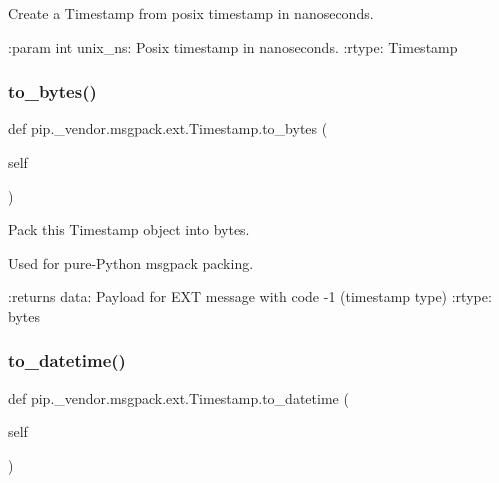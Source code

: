 \begin{DoxyVerb}Create a Timestamp from posix timestamp in nanoseconds.

:param int unix_ns: Posix timestamp in nanoseconds.
:rtype: Timestamp
\end{DoxyVerb}
 \mbox{\label{classpip_1_1__vendor_1_1msgpack_1_1ext_1_1Timestamp_a7285a185b266aee511f617c196fa0136}} 
\subsubsection{\texorpdfstring{to\+\_\+bytes()}{to\_bytes()}}
{\footnotesize\ttfamily def pip.\+\_\+vendor.\+msgpack.\+ext.\+Timestamp.\+to\+\_\+bytes (\begin{DoxyParamCaption}\item[{}]{self }\end{DoxyParamCaption})}

\begin{DoxyVerb}Pack this Timestamp object into bytes.

Used for pure-Python msgpack packing.

:returns data: Payload for EXT message with code -1 (timestamp type)
:rtype: bytes
\end{DoxyVerb}
 \mbox{\label{classpip_1_1__vendor_1_1msgpack_1_1ext_1_1Timestamp_a39c65017f3feb922755eb646ef1d9d01}} 
\subsubsection{\texorpdfstring{to\+\_\+datetime()}{to\_datetime()}}
{\footnotesize\ttfamily def pip.\+\_\+vendor.\+msgpack.\+ext.\+Timestamp.\+to\+\_\+datetime (\begin{DoxyParamCaption}\item[{}]{self }\end{DoxyParamCaption})}

